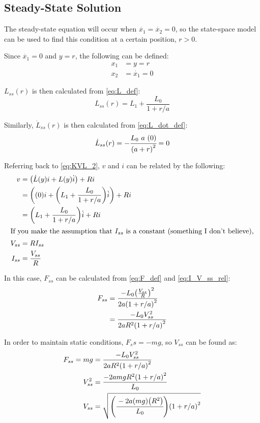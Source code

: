 \documentclass[letter]{article}
\begin{document}
\subsection{Steady-State Solution}

The steady-state equation will occur when $\dot{x_1} = \dot{x_2} = 0$, so the state-space model can be used to find this condition at a certain position, $r>0$.

Since $\dot{x_1} = 0$ and $y = r$, the following can be defined:
\begin{align}
	x_1 &= y = r \label{eq:x_1_ss}\\
	x_2 &= \dot{x_1} = 0 \label{eq:x_2_ss}
\end{align}

$L_{ss}(r)$ is then calculated from \eqref{eq:L_def}:
\begin{equation} \label{eq:L_ss}
	L_{ss}(r) =  L_1 + \frac{L_0}{1 + r/a}
\end{equation}

Similarly, $\dot{L}_{ss}(r)$ is then calculated from \eqref{eq:L_dot_def}:
\begin{equation}\label{eq:L_dot_ss}
	\dot{L}_{ss}(r) = - \cfrac{L_0 \ a \ (0)}{\qty(a + r)^2} = 0
\end{equation}

Referring back to \eqref{eq:KVL_2}, $v$ and $i$ can be related by the following:
\begin{align}
	v 	&= \qty(\dot{L}(y) i + L(y) \dot{i}) + R i \nonumber \\
		&= \qty((0) i + \qty(L_1 + \frac{L_0}{1 + r/a}) \dot{i}) + R i \nonumber \\
		&= \qty(L_1 + \frac{L_0}{1 + r/a}) \dot{i} + R i \label{eq:KVL_3}\\
	\intertext{If you make the assumption that $I_{ss}$ is a constant (something I don't believe),}
	V_{ss}	&= R I_{ss}\\
	I_{ss}	&= \frac{V_{ss}}{R} \label{eq:I_V_ss_rel}
\end{align}

In this case, $F_{ss}$ can be calculated from \eqref{eq:F_def} and \eqref{eq:I_V_ss_rel}:
\begin{align}
	F_{ss} 	&= \frac{- L_0 \qty(\frac{V_{ss}}{R})^2}{2 a \qty(1+r/a)^2} \nonumber \\
			&= \frac{- L_0 V_{ss}^2}{2 a R^2 \qty(1+r/a)^2}\label{eq:F_ss_def}
\end{align}

In order to maintain static conditions, $F_ss = - m g$, so $V_{ss}$ can be found as:
\begin{align}
	F_{ss} = mg &= \frac{- L_0 V_{ss}^2}{2 a R^2 \qty(1+r/a)^2}\\
	V_{ss}^2	&= \frac{- 2 a m g R^2 \qty(1+r/a)^2}{L_0}\\
	V_{ss}		&= \sqrt{\qty(\cfrac{-2 a \qty(mg) \qty(R^2)}{L_0}) \qty(1+r/a)^2} \label{eq:V_ss_def}
\end{align}
\end{document}
